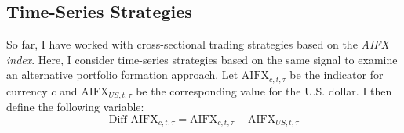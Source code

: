 \documentclass[12pt,oneside,letter]{article}
\begin{document}
		\subsection{Time-Series Strategies}				\label{Time-Series Strategies}		
		So far, I have worked with cross-sectional trading strategies based on the \textit{AIFX index}. Here, I consider time-series strategies based on the same signal to examine an alternative portfolio formation approach. Let \(\text{AIFX}_{c,t,\tau}\) be the indicator for currency \(c\) and \(\text{AIFX}_{US,t,\tau}\) be the corresponding value for the U.S. dollar. I then define the following variable:
		\begin{equation}
			\text{Diff AIFX}_{c,t,\tau} = \text{AIFX}_{c,t,\tau} - \text{AIFX}_{US,t,\tau}
			\label{eq:Performance:definition of diff currency usd ratio}
		\end{equation}
\end{document}
